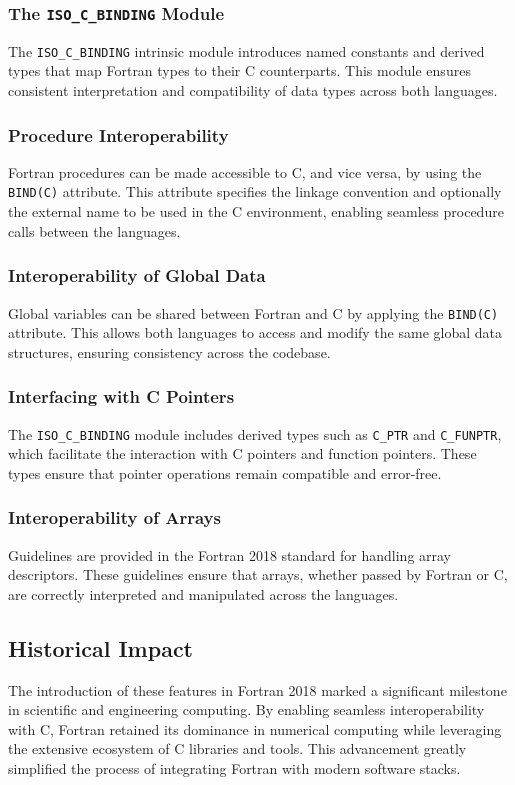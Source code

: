 \subsubsection{The \texttt{ISO\_C\_BINDING} Module}
The \texttt{ISO\_C\_BINDING} intrinsic module introduces named constants and derived types that map Fortran types to their C counterparts. This module ensures consistent interpretation and compatibility of data types across both languages.

\subsubsection{Procedure Interoperability}
Fortran procedures can be made accessible to C, and vice versa, by using the \texttt{BIND(C)} attribute. This attribute specifies the linkage convention and optionally the external name to be used in the C environment, enabling seamless procedure calls between the languages.

\subsubsection{Interoperability of Global Data}
Global variables can be shared between Fortran and C by applying the \texttt{BIND(C)} attribute. This allows both languages to access and modify the same global data structures, ensuring consistency across the codebase.

\subsubsection{Interfacing with C Pointers}
The \texttt{ISO\_C\_BINDING} module includes derived types such as \texttt{C\_PTR} and \texttt{C\_FUNPTR}, which facilitate the interaction with C pointers and function pointers. These types ensure that pointer operations remain compatible and error-free.

\subsubsection{Interoperability of Arrays}
Guidelines are provided in the Fortran 2018 standard for handling array descriptors. These guidelines ensure that arrays, whether passed by Fortran or C, are correctly interpreted and manipulated across the languages.

\subsection{Historical Impact}
The introduction of these features in Fortran 2018 marked a significant milestone in scientific and engineering computing. By enabling seamless interoperability with C, Fortran retained its dominance in numerical computing while leveraging the extensive ecosystem of C libraries and tools. This advancement greatly simplified the process of integrating Fortran with modern software stacks.

